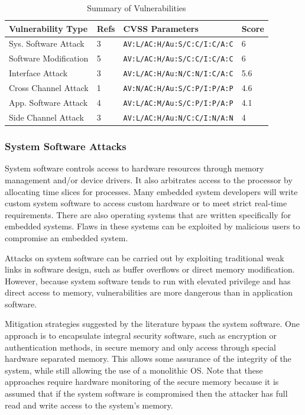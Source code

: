\documentclass[final,conference,10pt]{IEEEtran}
\begin{document}
\begin{table}[!t]
\renewcommand{\arraystretch}{1.3}
\caption{Summary of Vulnerabilities}
\label{tab:vul_summary}
\tiny
\centering
\begin{tabular}{ | l | l | l | l | }
\hline
 Vulnerability Type & Refs & CVSS Parameters & Score \\ \hline
 Sys. Software Attack	& 3 &	\verb|AV:L/AC:H/Au:S/C:C/I:C/A:C| 	& 6		\\ \hline
 Software Modification	& 5 &	\verb|AV:L/AC:H/Au:S/C:C/I:C/A:C|	& 6		\\ \hline
 Interface Attack		& 3	&	\verb|AV:L/AC:H/Au:N/C:N/I:C/A:C|	& 5.6	\\ \hline
 Cross Channel Attack	& 1 &	\verb|AV:N/AC:H/Au:S/C:P/I:P/A:P|	& 4.6	\\ \hline
 App. Software Attack	& 4 &	\verb|AV:L/AC:M/Au:S/C:P/I:P/A:P|	& 4.1	\\ \hline
 Side Channel Attack		& 3 &	\verb|AV:L/AC:H/Au:N/C:C/I:N/A:N|	& 4		\\ \hline
\end{tabular}
\end{table}

\subsubsection{System Software Attacks}
System software controls access to hardware resources through memory management and/or device drivers.  It also arbitrates access to the processor by allocating time slices for processes.  Many embedded system developers will write custom system software to access custom hardware or to meet strict real-time requirements. There are also operating systems that are written specifically for embedded systems.  Flaws in these systems can be exploited by malicious users to compromise an embedded system.  

Attacks on system software can be carried out by exploiting traditional weak links in software design, such as buffer overflows or direct memory modification.  However, because system software tends to run with elevated privilege and has direct access to memory, vulnerabilities are more dangerous than in application software.  

Mitigation strategies suggested by the literature bypass the system software.  One approach is to encapsulate integral security software, such as encryption or authentication methods, in secure memory and only access through special hardware separated memory.\cite{inveos}  This allows some assurance of the integrity of the system, while still allowing the use of a monolithic OS.  Note that these approaches require hardware monitoring of the secure memory because it is assumed that if the system software is compromised then the attacker has full read and write access to the system's memory.
\end{document}
